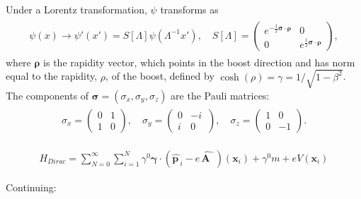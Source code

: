 \documentclass{report}
\begin{document}
Under a Lorentz transformation, $\psi$ transforms as
\begin{align}
\begin{aligned}
\psi(x) \to \psi'(x') = S[\Lambda] \psi(\Lambda^{-1} x'), \quad S[\Lambda] =
\begin{pmatrix}
e^{-\frac{1}{2} \boldsymbol \sigma \cdot \boldsymbol \rho} & 0 \\
0 & e^{\frac{1}{2} \boldsymbol \sigma \cdot \boldsymbol \rho}
\end{pmatrix},
\end{aligned}
\end{align}
where $\boldsymbol \rho$ is the rapidity vector, which points in the boost direction and has norm equal to the rapidity, $\rho$, of the boost, defined by $\cosh(\rho) = \gamma = 1/\sqrt{1-\beta^2}$. The components of $\boldsymbol \sigma = (\sigma_x, \sigma_y, \sigma_z)$ are the Pauli matrices:
\begin{align}
\begin{aligned}
\sigma_x =
\begin{pmatrix}
0 & 1 \\
1 & 0
\end{pmatrix}, \quad
\sigma_y =
\begin{pmatrix}
0 & -i \, \\
i & 0 \,
\end{pmatrix}, \quad
\sigma_z =
\begin{pmatrix}
1 & 0 \\
0 & -1
\end{pmatrix}.
\end{aligned}
\end{align}

\begin{align}
H_{Dirac} =\sum_{N=0}^{\infty} \sum_{i=1}^{N} \gamma^0 \boldsymbol \gamma \cdot (\hat{\boldsymbol p\,}_i\! - e \!\hat{\,\boldsymbol A\,\,\,}\!\!\!)(\boldsymbol x_i) + \gamma^0 m + e V(\boldsymbol x_i)
\end{align}

Continuing:
\end{document}
